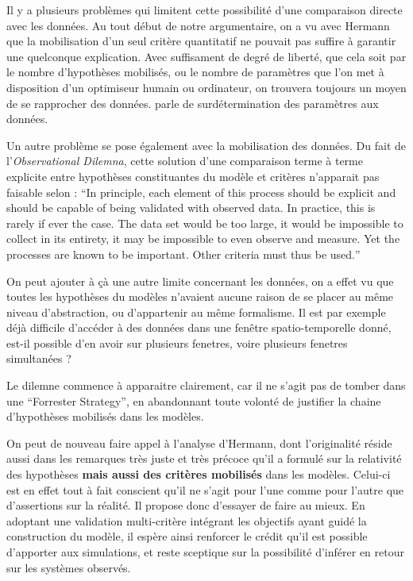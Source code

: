 
Il y a plusieurs problèmes qui limitent cette possibilité d'une comparaison directe avec les données. Au tout début de notre argumentaire, on a vu avec Hermann que la mobilisation d'un seul critère quantitatif ne pouvait pas suffire à garantir une quelconque explication. Avec suffisament de degré de liberté, que cela soit par le nombre d'hypothèses mobilisés, ou le nombre de paramètres que l'on met à disposition d'un optimiseur humain ou ordinateur, on trouvera toujours un moyen de se rapprocher des données. \textcite[17]{Amblard2006} parle de surdétermination des paramètres aux données.

Un autre problème se pose également avec la mobilisation des données. Du fait de l'\textit{Observational Dilemna}, cette solution d'une comparaison terme à terme explicite entre hypothèses constituantes du modèle et critères n'apparait pas faisable selon \textcite{Batty2001} : \foreignquote{english}{In principle, each element of this process should be explicit and should be capable of being validated with observed data. In practice, this is rarely if ever the case. The data set would be too large, it would be impossible to collect in its entirety, it may be impossible to even observe and measure. Yet the processes are known to be important. Other criteria must thus be used.} 

On peut ajouter à çà une autre limite concernant les données, on a effet vu que toutes les hypothèses du modèles n'avaient aucune raison de se placer au même niveau d'abstraction, ou d'appartenir au même formalisme. Il est par exemple déjà difficile d'accéder à des données dans une fenêtre spatio-temporelle donné, est-il possible d'en avoir sur plusieurs fenetres, voire plusieurs fenetres simultanées ? 

Le dilemne commence à apparaitre clairement, car il ne s'agit pas de tomber dans une \foreignquote{english}{Forrester Strategy}, en abandonnant toute volonté de justifier la chaine d'hypothèses mobilisés dans les modèles.

On peut de nouveau faire appel à l'analyse d'Hermann, dont l'originalité réside aussi dans les remarques très juste et très précoce qu'il a formulé sur la relativité des hypothèses \textbf{mais aussi des critères mobilisés} dans les modèles. Celui-ci est en effet tout à fait conscient qu'il ne s'agit pour l'une comme pour l'autre que d'assertions sur la réalité. Il propose donc d'essayer de faire au mieux. En adoptant une validation multi-critère  intégrant les objectifs ayant guidé la construction du modèle, il espère ainsi renforcer le crédit qu'il est possible d'apporter aux simulations, et reste sceptique sur la possibilité d'inférer en retour sur les systèmes observés.

